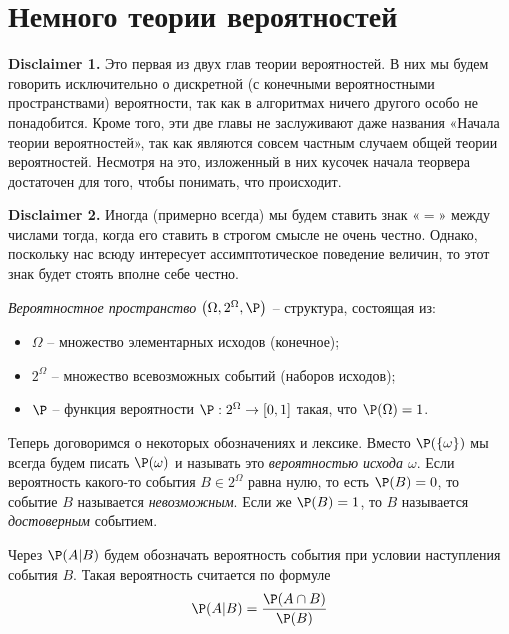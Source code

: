 \section{Немного теории вероятностей}

\textbf{Disclaimer 1.} Это первая из двух глав теории вероятностей. В них мы будем говорить исключительно о дискретной (с конечными вероятностными пространствами) вероятности, так как в алгоритмах ничего другого особо не понадобится. Кроме того, эти две главы не заслуживают даже названия «Начала теории вероятностей», так как являются совсем частным случаем общей теории вероятностей. Несмотря на это, изложенный в них кусочек начала теорвера достаточен для того, чтобы понимать, что происходит. \par

\textbf{Disclaimer 2.} Иногда (примерно всегда) мы будем ставить знак «$=$» между числами тогда, когда его ставить в строгом смысле не очень честно. Однако, поскольку нас всюду интересует ассимптотическое поведение величин, то этот знак будет стоять вполне себе честно. \par

\begin{definition}
    \textit{Вероятностное пространство} $\left( \Omega, 2^{\Omega}, \P \right)$ -- структура, состоящая из:
    \begin{itemize}
        \item $\Omega$ -- множество элементарных исходов (конечное);
        \item $2^{\Omega}$ -- множество всевозможных событий (наборов исходов);
        \item $\P$ -- функция вероятности $\P: 2^{\Omega} \to [0, 1]$ такая, что $\P(\Omega) = 1$.
    \end{itemize}
\end{definition}

Теперь договоримся о некоторых обозначениях и лексике. Вместо $\P(\lbrace\omega\rbrace)$ мы всегда будем писать $\P(\omega)$ и называть это \textit{вероятностью исхода $\omega$}. Если вероятность какого-то события $B \in 2^{\Omega}$ равна нулю, то есть $\P(B) = 0$, то событие $B$ называется \textit{невозможным}. Если же $\P(B) = 1$, то $B$ называется \textit{достоверным} событием. \par

Через $\P(A \vert B)$ будем обозначать вероятность события при условии наступления события $B$. Такая вероятность считается по формуле
\[
    \P(A \vert B) = \frac{\P(A \cap B)}{\P(B)}
\]

